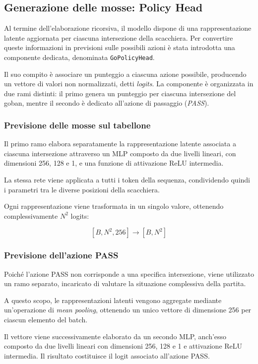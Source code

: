 \subsection{Generazione delle mosse: Policy Head}

Al termine dell'elaborazione ricorsiva, il modello dispone di una rappresentazione latente aggiornata per ciascuna intersezione della scacchiera. Per convertire queste informazioni in previsioni sulle possibili azioni è stata introdotta una componente dedicata, denominata \texttt{GoPolicyHead}.

Il suo compito è associare un punteggio a ciascuna azione possibile, producendo un vettore di valori non normalizzati, detti \textit{logits}. La componente è organizzata in due rami distinti: il primo genera un punteggio per ciascuna intersezione del goban, mentre il secondo è dedicato all'azione di passaggio (\textit{PASS}).

\subsubsection{Previsione delle mosse sul tabellone}

Il primo ramo elabora separatamente la rappresentazione latente associata a ciascuna intersezione attraverso un MLP composto da due livelli lineari, con dimensioni 256, 128 e 1, e una funzione di attivazione ReLU intermedia.

La stessa rete viene applicata a tutti i token della sequenza, condividendo quindi i parametri tra le diverse posizioni della scacchiera.

Ogni rappresentazione viene trasformata in un singolo valore, ottenendo complessivamente $N^2$ logits:

\[
    [B, N^2, 256]
    \longrightarrow
    [B, N^2]
\]

\subsubsection{Previsione dell'azione PASS}

Poiché l'azione PASS non corrisponde a una specifica intersezione, viene utilizzato un ramo separato, incaricato di valutare la situazione complessiva della partita.

A questo scopo, le rappresentazioni latenti vengono aggregate mediante un'operazione di \textit{mean pooling}, ottenendo un unico vettore di dimensione 256 per ciascun elemento del batch.

Il vettore viene successivamente elaborato da un secondo MLP, anch'esso composto da due livelli lineari con dimensioni 256, 128 e 1 e attivazione ReLU intermedia. Il risultato costituisce il logit associato all'azione PASS.

